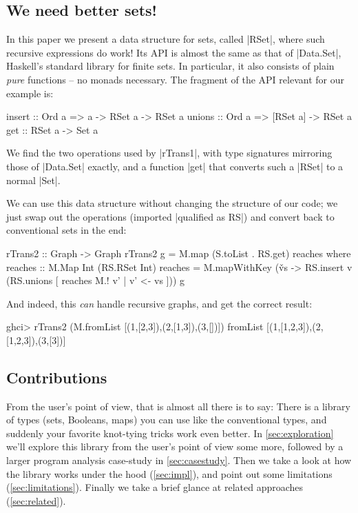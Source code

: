 \documentclass[manuscript,screen,acmsmall,nonacm]{acmart}
\begin{document}
\subsection{We need better sets!}

In this paper we present a data structure for sets, called |RSet|, where such recursive expressions do work! Its API is almost the same as that of |Data.Set|, Haskell's standard library for finite sets. In particular, it also consists of plain \emph{pure} functions -- no monads necessary. The fragment of the API relevant for our example is:
\begin{code}
insert  :: Ord a =>  a -> RSet a  -> RSet a
unions  :: Ord a =>  [RSet a]     -> RSet a
get     ::           RSet a       -> Set a
\end{code}
We find the two operations used by |rTrans1|, with type signatures mirroring those of |Data.Set| exactly, and a function |get| that converts such a |RSet| to a normal |Set|.

We can use this data structure without changing the structure of our code; we just swap out the operations (imported |qualified as RS|) and convert back to conventional sets in the end:
\begin{code}
rTrans2 :: Graph -> Graph
rTrans2 g = M.map (S.toList . RS.get) reaches
  where
    reaches :: M.Map Int (RS.RSet Int)
    reaches = M.mapWithKey (\v vs -> RS.insert v (RS.unions [ reaches M.! v' | v' <- vs ])) g
\end{code}

And indeed, this \emph{can} handle recursive graphs, and get the correct result:
\begin{code}
ghci> rTrans2 (M.fromList [(1,[2,3]),(2,[1,3]),(3,[])])
fromList [(1,[1,2,3]),(2,[1,2,3]),(3,[3])]
\end{code}

\subsection{Contributions}

From the user’s point of view, that is almost all there is  to say: There is a library of types (sets, Booleans, maps) you can use like the conventional types, and suddenly your favorite knot-tying tricks work even better. In \cref{sec:exploration} we'll explore this library from the user's point of view some more, followed by a larger program analysis case-study in \cref{sec:casestudy}. Then we take a look at how the library works under the hood (\cref{sec:impl}), and point out some limitations (\cref{sec:limitations}). Finally we take a brief glance at related approaches (\cref{sec:related}).
\end{document}
